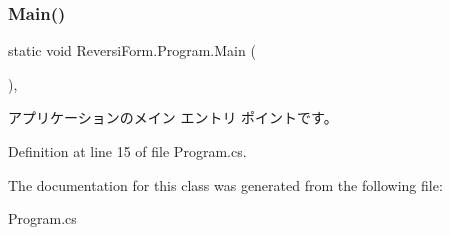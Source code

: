 \subsubsection{\texorpdfstring{Main()}{Main()}}
{\footnotesize\ttfamily static void Reversi\+Form.\+Program.\+Main (\begin{DoxyParamCaption}{ }\end{DoxyParamCaption})\hspace{0.3cm}{\ttfamily [static]}, {\ttfamily [private]}}



アプリケーションのメイン エントリ ポイントです。 



Definition at line 15 of file Program.\+cs.



The documentation for this class was generated from the following file\+:\begin{DoxyCompactItemize}
\item 
Program.\+cs\end{DoxyCompactItemize}
